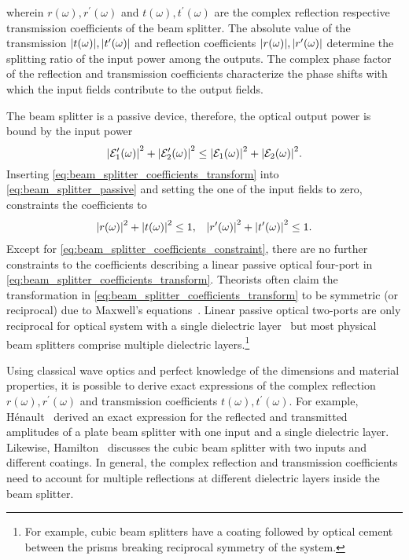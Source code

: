 wherein $r(\omega),r^\prime(\omega)$ and $t(\omega),t^\prime(\omega)$ are the complex reflection respective transmission coefficients of the beam splitter.
The absolute value of the transmission $\abs{t(\omega)},\abs{t^\prime(\omega)}$ and reflection coefficients $\abs{r(\omega)},\abs{r^\prime(\omega)}$ determine the splitting ratio of the input power among the outputs.
The complex phase factor of the reflection and transmission coefficients characterize the phase shifts with which the input fields contribute to the output fields.

The beam splitter is a passive device, therefore, the optical output power is bound by the input power
\begin{equation}
    \abs{\mathcal{E}_1^\prime(\omega)}^2
    +
    \abs{\mathcal{E}_2^\prime(\omega)}^2
    \leq
    \abs{\mathcal{E}_1(\omega)}^2
    +
    \abs{\mathcal{E}_2(\omega)}^2
    \label{eq:beam_splitter_passive}.
\end{equation}
Inserting \cref{eq:beam_splitter_coefficients_transform} into \cref{eq:beam_splitter_passive} and setting the one of the input fields to zero, constraints the coefficients to
\begin{align}
    \abs{r(\omega)}^2+\abs{t(\omega)}^2\leq1,
    &&
    \abs{r^\prime(\omega)}^2+\abs{t^\prime(\omega)}^2\leq1
    \label{eq:beam_splitter_coefficients_constraint}.
\end{align}
Except for \cref{eq:beam_splitter_coefficients_constraint}, there are no further constraints to the coefficients describing a linear passive optical four-port in \cref{eq:beam_splitter_coefficients_transform}.
Theorists often claim the transformation in \cref{eq:beam_splitter_coefficients_transform} to be symmetric (or reciprocal) due to Maxwell's equations~\cite[p.~129]{Haroche2006}.
Linear passive optical two-ports are only reciprocal for optical system with a single dielectric layer~\cite{Potton2004} but most physical beam splitters comprise multiple dielectric layers.\footnote{For example, cubic beam splitters have a coating followed by optical cement between the prisms breaking reciprocal symmetry of the system.}

Using classical wave optics and perfect knowledge of the dimensions and material properties, it is possible to derive exact expressions of the complex reflection $r(\omega),r^\prime(\omega)$ and transmission coefficients $t(\omega),t^\prime(\omega)$.
For example, Hénault~\cite{Henault2015} derived an exact expression for the reflected and transmitted amplitudes of a plate beam splitter with one input and a single dielectric layer.
Likewise, Hamilton~\cite{Hamilton2000} discusses the cubic beam splitter with two inputs and different coatings.
In general, the complex reflection and transmission coefficients need to account for multiple reflections at different dielectric layers inside the beam splitter.

